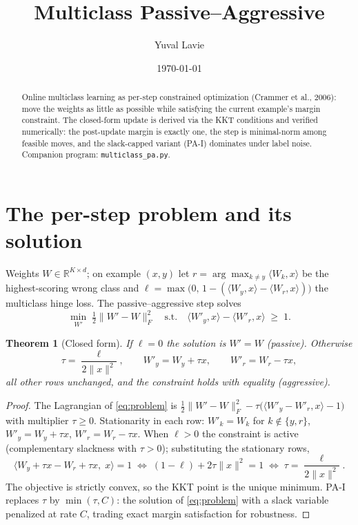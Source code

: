 \documentclass[11pt]{article}
\title{Multiclass Passive--Aggressive}
\author{Yuval Lavie}
\date{\today}
\newtheorem{theorem}{Theorem}
\theoremstyle{remark}
\begin{document}
\maketitle

\begin{abstract}
Online multiclass learning as per-step constrained optimization
(Crammer et al., 2006): move the weights as little as possible while
satisfying the current example's margin constraint. The closed-form
update is derived via the KKT conditions and verified numerically:
the post-update margin is exactly one, the step is minimal-norm among
feasible moves, and the slack-capped variant (PA-I) dominates under
label noise. Companion program: \texttt{multiclass\_pa.py}.
\end{abstract}

\section{The per-step problem and its solution}

Weights $W \in \mathbb{R}^{K \times d}$; on example $(x, y)$ let
$r = \arg\max_{k \ne y} \langle W_k, x\rangle$ be the highest-scoring
wrong class and $\ell = \max\bigl(0,\, 1 - (\langle W_y, x\rangle -
\langle W_r, x\rangle)\bigr)$ the multiclass hinge loss. The
passive--aggressive step solves
\begin{equation}
  \min_{W'} \;\tfrac12\|W' - W\|_F^2
  \quad\text{s.t.}\quad
  \langle W'_y, x\rangle - \langle W'_r, x\rangle \;\ge\; 1.
  \label{eq:problem}
\end{equation}

\begin{theorem}[Closed form]
\label{thm:pa}
If $\ell = 0$ the solution is $W' = W$ (passive). Otherwise
\begin{equation}
  \boxed{\;\tau = \frac{\ell}{2\|x\|^2}, \qquad
  W'_y = W_y + \tau x, \qquad W'_r = W_r - \tau x,\;}
  \label{eq:step}
\end{equation}
all other rows unchanged, and the constraint holds with equality
(aggressive).
\end{theorem}

\begin{proof}
The Lagrangian of \eqref{eq:problem} is
$\tfrac12\|W' - W\|_F^2 - \tau\bigl(\langle W'_y - W'_r, x\rangle
- 1\bigr)$ with multiplier $\tau \ge 0$. Stationarity in each row:
$W'_k = W_k$ for $k \notin \{y, r\}$, $W'_y = W_y + \tau x$,
$W'_r = W_r - \tau x$. When $\ell > 0$ the constraint is active
(complementary slackness with $\tau > 0$); substituting the
stationary rows,
\begin{equation*}
  \langle W_y + \tau x - W_r + \tau x,\; x\rangle = 1
  \;\Longleftrightarrow\;
  (1 - \ell) + 2\tau\|x\|^2 = 1
  \;\Longleftrightarrow\;
  \tau = \frac{\ell}{2\|x\|^2}.
\end{equation*}
The objective is strictly convex, so the KKT point is the unique
minimum. PA-I replaces $\tau$ by $\min(\tau, C)$: the solution of
\eqref{eq:problem} with a slack variable penalized at rate $C$,
trading exact margin satisfaction for robustness.
\end{proof}
\end{document}
